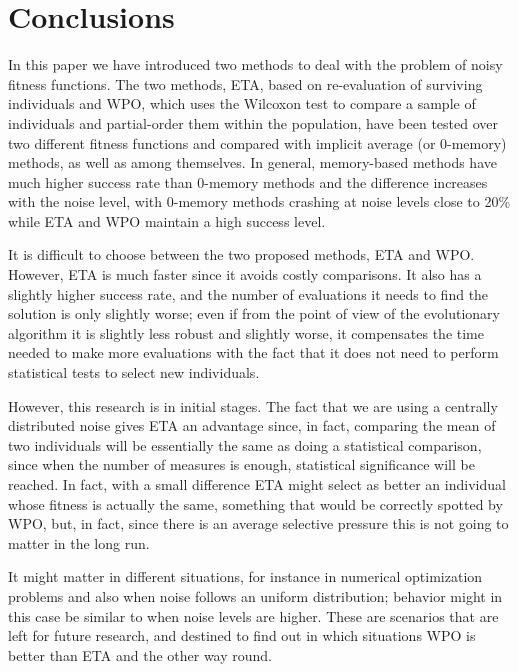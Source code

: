 \documentclass{llncs}
\begin{document}

\section{Conclusions}

In this paper we have introduced two methods to deal with the problem
of noisy fitness functions. The two methods, {\sf ETA}, based on
re-evaluation of surviving individuals and {\sf WPO}, which uses the
Wilcoxon test to compare a sample of individuals and partial-order
them within the population, 
 have been tested over two
different fitness functions and compared with implicit average (or
0-memory) methods, as well as among themselves. In general,
memory-based methods have much higher success rate than 0-memory
methods and the difference increases with the noise level, with
0-memory methods crashing at noise levels close to 20\% while ETA and
WPO maintain a high success level.

It is difficult to choose between the two proposed methods, ETA and
WPO. However, ETA is much faster since it avoids costly
comparisons. It also has a slightly higher success rate, and the
number of evaluations it needs to find the solution is only slightly
worse; even if from the point of view of the evolutionary algorithm it
is slightly less robust and slightly worse, it compensates the time
needed to make more evaluations with the fact that it does not need to
perform statistical tests to select new individuals.

However, this research is in initial stages. The fact that we are
using a centrally distributed noise gives ETA an advantage since, in
fact, comparing the mean of two individuals will be essentially the
same as doing a statistical comparison, since when the number of
measures is enough, statistical significance will be reached. In fact,
with a small difference ETA might select as better an individual whose
fitness is actually the same, something that would be correctly
spotted by WPO, but, in fact, since there is an average selective
pressure this is not going to matter in the long run. 

It might matter in different situations, for instance in numerical
optimization problems and also when noise follows an uniform
distribution; behavior might in this case be similar to when noise
levels are higher. These are scenarios that are left for future
research, and destined to find out in which situations WPO is better
than ETA and the other way round. 
\end{document}

